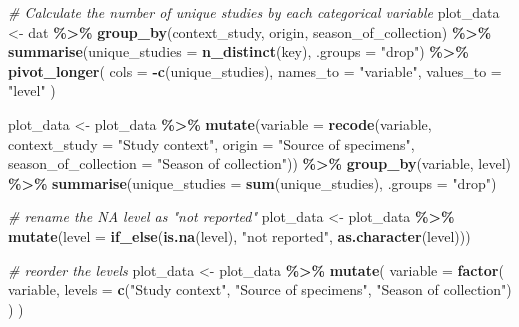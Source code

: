 \documentclass[
]{article}
\newenvironment{Shaded}{\begin{snugshade}}{\end{snugshade}}
\newcommand{\AttributeTok}[1]{\textcolor[rgb]{0.13,0.29,0.53}{#1}}
\newcommand{\CommentTok}[1]{\textcolor[rgb]{0.56,0.35,0.01}{\textit{#1}}}
\newcommand{\FunctionTok}[1]{\textcolor[rgb]{0.13,0.29,0.53}{\textbf{#1}}}
\newcommand{\NormalTok}[1]{#1}
\newcommand{\OtherTok}[1]{\textcolor[rgb]{0.56,0.35,0.01}{#1}}
\newcommand{\SpecialCharTok}[1]{\textcolor[rgb]{0.81,0.36,0.00}{\textbf{#1}}}
\newcommand{\StringTok}[1]{\textcolor[rgb]{0.31,0.60,0.02}{#1}}
\begin{document}
\begin{Shaded}
\begin{Highlighting}[]
\CommentTok{\# Calculate the number of unique studies by each categorical variable}
\NormalTok{plot\_data }\OtherTok{\textless{}{-}}\NormalTok{ dat }\SpecialCharTok{\%\textgreater{}\%}
  \FunctionTok{group\_by}\NormalTok{(context\_study, origin, season\_of\_collection) }\SpecialCharTok{\%\textgreater{}\%}
  \FunctionTok{summarise}\NormalTok{(}\AttributeTok{unique\_studies =} \FunctionTok{n\_distinct}\NormalTok{(key), }\AttributeTok{.groups =} \StringTok{"drop"}\NormalTok{) }\SpecialCharTok{\%\textgreater{}\%}
  \FunctionTok{pivot\_longer}\NormalTok{(}
    \AttributeTok{cols =} \SpecialCharTok{{-}}\FunctionTok{c}\NormalTok{(unique\_studies),}
    \AttributeTok{names\_to =} \StringTok{"variable"}\NormalTok{,}
    \AttributeTok{values\_to =} \StringTok{"level"}
\NormalTok{  )}

\NormalTok{plot\_data }\OtherTok{\textless{}{-}}\NormalTok{ plot\_data }\SpecialCharTok{\%\textgreater{}\%}
  \FunctionTok{mutate}\NormalTok{(}\AttributeTok{variable =} \FunctionTok{recode}\NormalTok{(variable,}
                           \AttributeTok{context\_study =} \StringTok{"Study context"}\NormalTok{,}
                           \AttributeTok{origin =} \StringTok{"Source of specimens"}\NormalTok{,}
                           \AttributeTok{season\_of\_collection =} \StringTok{"Season of collection"}\NormalTok{)) }\SpecialCharTok{\%\textgreater{}\%}
  \FunctionTok{group\_by}\NormalTok{(variable, level) }\SpecialCharTok{\%\textgreater{}\%}
  \FunctionTok{summarise}\NormalTok{(}\AttributeTok{unique\_studies =} \FunctionTok{sum}\NormalTok{(unique\_studies), }\AttributeTok{.groups =} \StringTok{"drop"}\NormalTok{)}

\CommentTok{\# rename the NA level as "not reported"}
\NormalTok{plot\_data }\OtherTok{\textless{}{-}}\NormalTok{ plot\_data }\SpecialCharTok{\%\textgreater{}\%}
  \FunctionTok{mutate}\NormalTok{(}\AttributeTok{level =} \FunctionTok{if\_else}\NormalTok{(}\FunctionTok{is.na}\NormalTok{(level), }\StringTok{"not reported"}\NormalTok{, }\FunctionTok{as.character}\NormalTok{(level)))}

\CommentTok{\#  reorder the levels}
\NormalTok{plot\_data }\OtherTok{\textless{}{-}}\NormalTok{ plot\_data }\SpecialCharTok{\%\textgreater{}\%}
  \FunctionTok{mutate}\NormalTok{(}
    \AttributeTok{variable =} \FunctionTok{factor}\NormalTok{(}
\NormalTok{      variable,}
      \AttributeTok{levels =} \FunctionTok{c}\NormalTok{(}\StringTok{"Study context"}\NormalTok{, }\StringTok{"Source of specimens"}\NormalTok{, }\StringTok{"Season of collection"}\NormalTok{)}
\NormalTok{    )}
\NormalTok{  )}


\end{Highlighting}
\end{Shaded}
\end{document}

